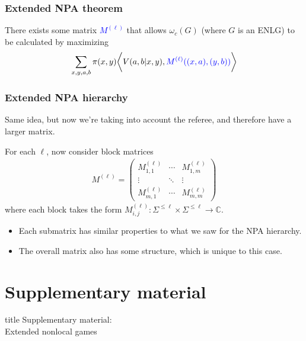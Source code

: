 \documentclass{beamer}
\newcommand{\biggip}[2]{\biggl\langle #1, #2 \biggr\rangle}
\def\complex{\mathbb{C}}
\begin{document}
\begin{frame}
	\frametitle{Extended NPA theorem}
	There exists some matrix \textcolor{blue}{$M^{(\ell)}$} that allows $\omega_c(G)$ (where $G$ is an ENLG) to be calculated by maximizing 
	\begin{align*}
		\sum_{x,y,a,b} \pi(x,y) \biggip{V(a,b|x,y)}{\textcolor{blue}{M^{(\ell)}((x,a),(y,b))}}
	\end{align*}
\end{frame}

\begin{frame}
	\frametitle{Extended NPA hierarchy}
	Same idea, but now we're taking into account the referee, and therefore have a larger matrix.
		
	For each $\ell$, now consider block matrices
	\begin{align*}
		M^{(\ell)} = \begin{pmatrix} M_{1,1}^{(\ell)} & \cdots & M_{1,m}^{(\ell)} \\ \vdots & \ddots & \vdots \\ M_{m,1}^{(\ell)} & \cdots & M_{m,m}^{(\ell)} \end{pmatrix}
	\end{align*}
	where each block takes the form $M_{i,j}^{(\ell)} : \Sigma^{\leq \ell} \times \Sigma^{\leq \ell} \rightarrow \complex$. 
	\begin{itemize}
		\item Each submatrix has similar properties to what we saw for the NPA hierarchy. 
		\item The overall matrix also has some structure, which is unique to this case.
	\end{itemize}
\end{frame}


  \section*{Supplementary material}

  \begin{frame}[noframenumbering]
  \vfill
  \centering
  \begin{beamercolorbox}[sep=8pt,center,shadow=true,rounded=true]{title}
    Supplementary material: \\ Extended nonlocal games
  \end{beamercolorbox}
  \vfill
  \end{frame}
\end{document}

